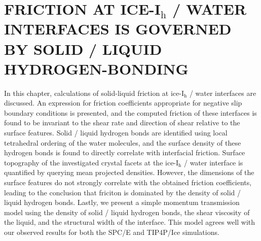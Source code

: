 \chapter{FRICTION AT ICE-I$_\mathrm{h}$ / WATER INTERFACES IS GOVERNED
  BY SOLID / LIQUID HYDROGEN-BONDING}\label{chap:Friction}

In this chapter, calculations of solid-liquid friction at
ice-I$_\mathrm{h}$ / water interfaces are discussed.  An expression
for friction coefficients appropriate for negative slip boundary
conditions is presented, and the computed friction of these interfaces
is found to be invariant to the shear rate and direction of shear
relative to the surface features. Solid / liquid hydrogen bonds are
identified using local tetrahedral ordering of the water molecules,
and the surface density of these hydrogen bonds is found to directly
correlate with interfacial friction. Surface topography of the
investigated crystal facets at the ice-I$_\mathrm{h}$ / water
interface is quantified by querying mean projected densities. However,
the dimensions of the surface features do not strongly correlate with
the obtained friction coefficients, leading to the conclusion that
friciton is dominated by the density of solid / liquid hydrogen
bonds.  Lastly, we present a simple momentum transmission model using
the density of solid / liquid hydrogen bonds, the shear viscosity of
the liquid, and the structural width of the interface. This model
agrees well with our observed results for both the SPC/E and TIP4P/Ice
simulations. 



